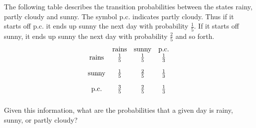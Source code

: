\begin{enumialphparenastyle}
\begin{ex} The following table describes the transition probabilities between the
states rainy, partly cloudy and sunny. The symbol p.c. indicates partly
cloudy. Thus if it starts off p.c. it ends up sunny the next day with
probability $\frac{1}{5}$. If it starts off sunny, it ends up sunny the next
day with probability $\frac{2}{5}$ and so forth.
\begin{equation*}
\begin{array}{cccc}
& \text{rains} & \text{sunny} & \text{p.c.} \\
\text{rains} & \vspace{0.05in}\frac{1}{5} & \vspace{0.05in}\frac{1}{5} & \vspace{0.05in}\frac{1}{3} \\
\text{sunny} & \vspace{0.05in}\frac{1}{5} & \vspace{0.05in}\frac{2}{5} & \vspace{0.05in}\frac{1}{3} \\
\text{p.c.} & \vspace{0.05in}\frac{3}{5} & \vspace{0.05in}\frac{2}{5} & \vspace{0.05in}\frac{1}{3}
\end{array}
\end{equation*}
Given this information, what are the probabilities that a given day is
rainy, sunny, or partly cloudy? \vspace{1mm}
\end{ex}


\end{enumialphparenastyle}
